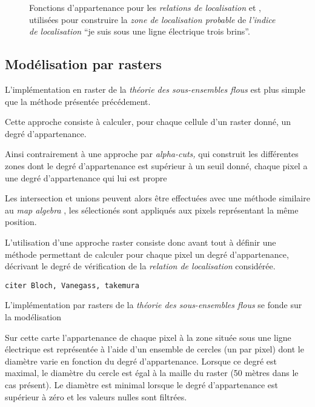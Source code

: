\begin{figure}
  \centering
  \subfloat{%
    
    \label{fig:fnc_app_Dist}
  }
  \hfill%
  \subfloat{%
    
    \label{fig:fnc_app_AltInf}
  }
  \caption{Fonctions d'appartenance pour les \emph{relations de
      localisation}
    \protect{}
    et
    \protect{},
    utilisées pour construire la \emph{zone de localisation probable}
    de \emph{l'indice de localisation} \enquote{je suis sous une ligne
      électrique trois brins}.}
  \label{fig:fnc_app_sousProche}
\end{figure}

\subsection{Modélisation par rasters}

L'implémentation en raster de la \emph{théorie des sous-ensembles
  flous} est plus simple que la méthode présentée précédement.

Cette approche consiste à calculer, pour chaque cellule d'un raster
donné, un degré d'appartenance.

Ainsi contrairement à une approche par \emph{alpha-cuts,} qui
construit les différentes zones dont le degré d'appartenance est
supérieur à un seuil donné, chaque pixel a une degré d'appartenance
qui lui est propre 

Les intersection et unions peuvent alors être effectuées avec une
méthode similaire au \emph{map algebra} \autocite{XX}, les sélectionés
sont appliqués aux pixels représentant la même position.


L'utilisation d'une approche raster consiste donc avant tout à définir
une méthode permettant de calculer pour chaque pixel un degré
d'appartenance, décrivant le degré de vérification de la
\emph{relation de localisation} considérée.

\texttt{citer Bloch, Vanegass, takemura}

L'implémentation par rasters de la \emph{théorie des sous-ensembles
  flous} se fonde sur la modélisation


Sur cette carte l'appartenance de chaque pixel à la zone située sous
une ligne électrique est représentée à l'aide d'un ensemble de cercles
(un par pixel) dont le diamètre varie en fonction du degré
d'appartenance. Lorsque ce degré est maximal, le diamètre du cercle
est égal à la maille du raster (50 mètres dans le cas présent). Le
diamètre est minimal lorsque le degré d'appartenance est supérieur à
zéro et les valeurs nulles sont filtrées.

